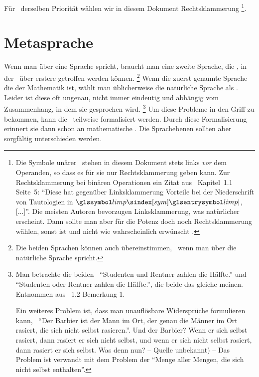 Für \Operationen\ derselben Priorität wählen wir in diesem Dokument Rechtsklammerung%
\footnote{%
	Die Symbole unärer \Operationen\ stehen in diesem Dokument stets links \emph{vor} dem Operanden, so dass es für sie nur Rechtsklammerung geben kann.
	Zur Rechtsklammerung bei binären Operationen ein Zitat aus~\cite{bib:Rautenberg} Kapitel~1.1 Seite~5:
	\enquote{Diese hat gegenüber Linksklammerung Vorteile bei der Niederschrift von Tautologien in $\symlimp$, [...]}.
	Die meisten Autoren bevorzugen Linksklammerung, was natürlicher erscheint.
	Dann sollte man aber für die Potenz doch noch Rechtsklammerung wählen, sonst ist  und nicht wie wahrscheinlich erwünscht .
}.

\section{Metasprache}%
\label{sec-Metasprache}

Wenn man über eine Sprache spricht, braucht man eine zweite Sprache, die , in der \Aussagen\ über erstere getroffen werden können.%
\footnote{%
	Die beiden Sprachen können auch übereinstimmen, \textzB\ wenn man über die natürliche Sprache spricht.
}
Wenn die zuerst genannte Sprache die der Mathematik ist, wählt man üblicherweise die natürliche Sprache als \Metasprache.
Leider ist diese oft ungenau, nicht immer eindeutig und abhängig vom Zusammenhang, in dem sie gesprochen wird.%
\footnote{%
	Man betrachte die beiden \Aussagen\ \enquote{Studenten und Rentner zahlen die Hälfte.} und \enquote{Studenten oder Rentner zahlen die Hälfte.}, die beide das gleiche meinen.
	-- Entnommen aus \cite{bib:Rautenberg} \sectionname~1.2 Bemerkung 1.

	Ein weiteres Problem ist, dass man unauflösbare Widersprüche formulieren kann, \textzB\ \enquote{Der Barbier ist der Mann im Ort, der genau die Männer im Ort rasiert, die sich nicht selbst rasieren.}.
	Und der Barbier?
	Wenn er sich selbst rasiert, dann rasiert er sich nicht selbst, und wenn er sich nicht selbst rasiert, dann rasiert er sich selbst.
	Was denn nun?
	-- Quelle unbekannt) --
	Das Problem ist verwandt mit dem Problem der \enquote{Menge aller Mengen, die sich nicht selbst enthalten}.
}
Um diese Probleme in den Griff zu bekommen, kann die \Metasprache\ teilweise formalisiert werden.
Durch diese Formalisierung erinnert sie dann schon an mathematische \Formeln.
Die Sprachebenen sollten aber sorgfältig unterschieden werden.

